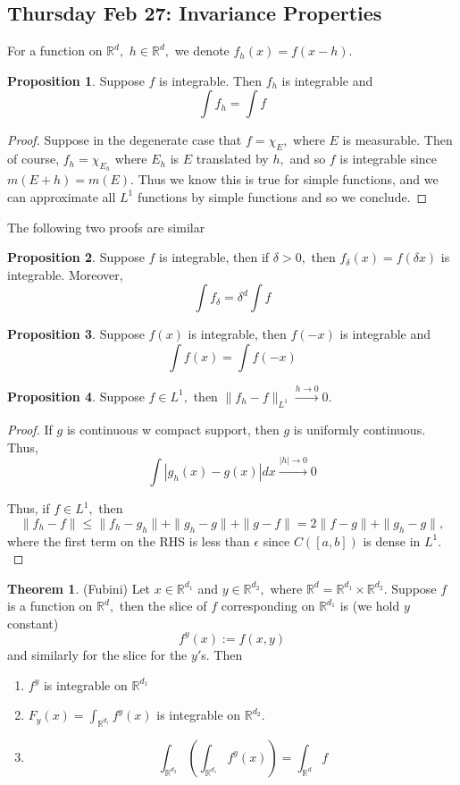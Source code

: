 \documentclass[10pt, oneside]{article}
\newcommand{\bbR}{\mathbb{R}}
\theoremstyle{definition}
\newtheorem{thm}{Theorem}
\newtheorem{prop}{Proposition}
\begin{document}
\newpage
\subsection{Thursday Feb 27: Invariance Properties}
For a function on $\bbR^d,$ $h \in \bbR^d,$ we denote $f_h(x) = f(x-h).$
\begin{prop}
    Suppose $f$ is integrable. Then $f_h$ is integrable and 
    \[\int f_h = \int f\]
\end{prop}
\begin{proof}
    Suppose in the degenerate case that $f = \chi_E,$ where $E$ is measurable. Then of course, $f_h = \chi_{E_h}$ where $E_h$ is $E$ translated by $h,$ and so $f$ is integrable since $m(E + h) = m(E).$ Thus we know this is true for simple functions, and we can approximate all $L^1$ functions by simple functions and so we conclude.
\end{proof}
The following two proofs are similar
\begin{prop}
    Suppose $f$ is integrable, then if $\delta>0,$ then $f_\delta(x) = f(\delta x)$ is integrable. Moreover,
    \[\int f_\delta = \delta^d \int f\]
\end{prop}
\begin{prop}
    Suppose $f(x)$ is integrable, then $f(-x)$ is integrable and 
    \[\int f(x) = \int f(-x)\]
\end{prop}

\begin{prop}
    Suppose $f \in L^1,$ then $\|f_h - f\|_{L^1} \xrightarrow[]{h \to 0} 0.$
\end{prop}
\begin{proof}
    If $g$ is continuous w compact support, then $g$ is uniformly continuous. Thus, 
    \[\int |g_h (x) - g(x)|dx \xrightarrow[]{|h|\to 0}0\]

    Thus, if $f \in L^1,$ then 
    \[\|f_h - f\| \leq \|f_h - g_h\| + \|g_h - g\| + \|g - f\| = 2\|f - g\| + \|g_h - g\|,\] where the first term on the RHS is less than $\epsilon$ since $C([a,b])$ is dense in $L^1.$
\end{proof}

\begin{thm}
    (Fubini) Let $x\in \bbR^{d_1}$ and $y\in \bbR^{d_2},$ where $\bbR^d = \bbR^{d_1} \times \bbR^{d_2}.$ Suppose $f$ is a function on $\bbR^d,$ then the slice of $f$ corresponding on $\bbR^{d_1}$ is (we hold $y$ constant)
    \[f^y(x):=f(x,y)\] and similarly for the slice for the $y'$s. Then 
    \begin{enumerate}
        \item $f^y$ is integrable on $\bbR^{d_1}$
        \item $F_y(x) = \int_{\bbR^{d_1}}f^y(x)$ is integrable on $\bbR^{d_2}.$
        \item 
        \[\int_{\bbR^{d_2}}\left(\int_{\bbR^{d_1}}f^y(x)\right) = \int_{\bbR^d}f\]
    \end{enumerate}
\end{thm}
\end{document}
